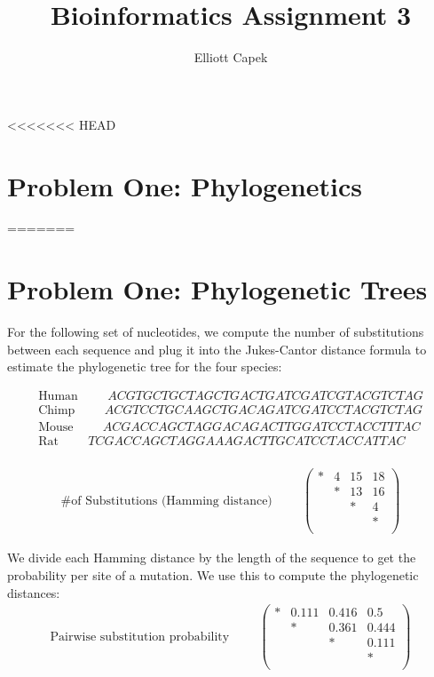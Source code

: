 \documentclass[10pt]{article} %
\title{Bioinformatics Assignment 3}
\author{Elliott Capek}
\begin{document}
\maketitle{}

<<<<<<< HEAD
\section{Problem One: Phylogenetics}

=======
\section{Problem One: Phylogenetic Trees}
For the following set of nucleotides, we compute the number of substitutions between
each sequence and plug it into the Jukes-Cantor distance formula to estimate the
phylogenetic tree for the four species:

\begin{align*}
  \mbox{Human} \hspace{1cm}ACGTGCTGCTAGCTGACTGATCGATCGTACGTCTAG\\
  \mbox{Chimp} \hspace{1cm}ACGTCCTGCAAGCTGACAGATCGATCCTACGTCTAG\\
  \mbox{Mouse} \hspace{1cm}ACGACCAGCTAGGACAGACTTGGATCCTACCTTTAC\\
  \mbox{Rat}   \hspace{1cm}TCGACCAGCTAGGAAAGACTTGCATCCTACCATTAC\\
\end{align*}

\begin{align*}
  \mbox{\# of Substitutions (Hamming distance)} \hspace{1cm}
  \begin{pmatrix}
    * & 4 & 15 & 18\\
    & * & 13 & 16\\
    & & * & 4\\
    & & & *\\
  \end{pmatrix}
\end{align*}

We divide each Hamming distance by the length of the sequence to get the probability per site
of a mutation. We use this to compute the phylogenetic distances:\\

\begin{align*}
  \mbox{Pairwise substitution probability} \hspace{1cm}
  \begin{pmatrix}
    * & 0.111 & 0.416 & 0.5\\
    & * & 0.361 & 0.444\\
    & & * & 0.111\\
    & & & *\\
  \end{pmatrix}
\end{align*}
\end{document}
